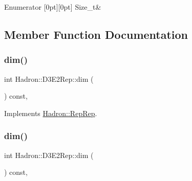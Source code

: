 \begin{DoxyEnumFields}{Enumerator}
[0pt][0pt]{}\mbox{\label{structHadron_1_1D3E2Rep_ae192a6d4ce4d8e9e240d225ab67bf847a2f1b559918156159e495ee08a367bb08}} 
Size\+\_\+t&\\
\hline

\end{DoxyEnumFields}


\subsection{Member Function Documentation}
\mbox{\label{structHadron_1_1D3E2Rep_a79f191ce59b4b506979041561fd3efd1}} 
\subsubsection{\texorpdfstring{dim()}{dim()}\hspace{0.1cm}{\footnotesize\ttfamily [1/3]}}
{\footnotesize\ttfamily int Hadron\+::\+D3\+E2\+Rep\+::dim (\begin{DoxyParamCaption}{ }\end{DoxyParamCaption}) const\hspace{0.3cm}{\ttfamily [inline]}, {\ttfamily [virtual]}}



Implements \mbox{\hyperlink{structHadron_1_1RepRep_a92c8802e5ed7afd7da43ccfd5b7cd92b}{Hadron\+::\+Rep\+Rep}}.

\mbox{\label{structHadron_1_1D3E2Rep_a79f191ce59b4b506979041561fd3efd1}} 
\subsubsection{\texorpdfstring{dim()}{dim()}\hspace{0.1cm}{\footnotesize\ttfamily [2/3]}}
{\footnotesize\ttfamily int Hadron\+::\+D3\+E2\+Rep\+::dim (\begin{DoxyParamCaption}{ }\end{DoxyParamCaption}) const\hspace{0.3cm}{\ttfamily [inline]}, {\ttfamily [virtual]}}



